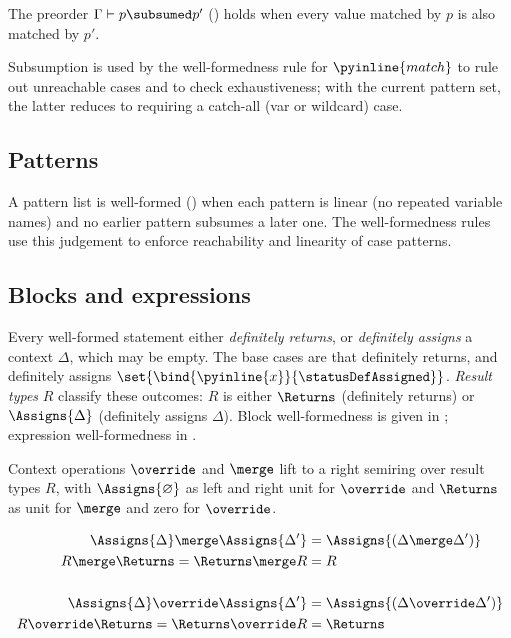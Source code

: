 \begin{definition}
The preorder $\Gamma \vdash p \subsumed p'$ () holds when every value matched by $p$ is also matched by $p'$.
\end{definition}

\noindent Subsumption is used by the well-formedness rule for $\pyinline{match}$ to rule out unreachable cases and to check exhaustiveness; with the current pattern set, the latter reduces to requiring a catch-all (var or wildcard) case.



\subsection{Patterns}

A pattern list is well-formed () when each pattern is linear (no repeated variable names) and no earlier pattern subsumes a later one. The  well-formedness rules use this judgement to enforce reachability and linearity of case patterns.



\subsection{Blocks and expressions}
\label{sec:wf-blocks}

Every well-formed statement either \emph{definitely returns}, or \emph{definitely assigns} a context
$\Delta$, which may be empty. The base cases are that  definitely returns, and  definitely assigns $\set{\bind{\pyinline{x}}{\statusDefAssigned}}$. \emph{Result types} $R$ classify these outcomes: $R$ is either $\Returns$ (definitely returns) or $\Assigns{\Delta}$ (definitely assigns $\Delta$). Block well-formedness is given in
; expression well-formedness in .

Context operations $\override$ and $\merge$ lift to a right semiring over result types $R$, with $\Assigns{\varnothing}$ as left and right unit for $\override$ and $\Returns$ as unit for $\merge$ and zero for $\override$.

\begin{definition}
{\small
\begin{align*}
\Assigns{\Delta} \merge \Assigns{\Delta'} & = \Assigns{(\Delta \merge \Delta')} \\
R \merge \Returns = \Returns \merge R & = R \\
\\
\Assigns{\Delta} \override \Assigns{\Delta'} & = \Assigns{(\Delta \override \Delta')} \\
R \override \Returns = \Returns \override R & = \Returns
\end{align*}}
\end{definition}


